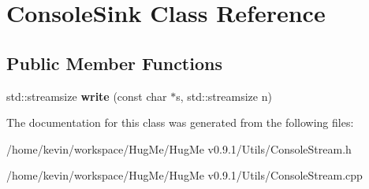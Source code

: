 \hypertarget{classConsoleSink}{
\section{ConsoleSink Class Reference}
\label{classConsoleSink}
}
\subsection*{Public Member Functions}
\begin{DoxyCompactItemize}
\item 
\hypertarget{classConsoleSink_a85f60198534d158e266a6bc38cbf2153}{
std::streamsize {\bfseries write} (const char $\ast$s, std::streamsize n)}
\label{classConsoleSink_a85f60198534d158e266a6bc38cbf2153}

\end{DoxyCompactItemize}


The documentation for this class was generated from the following files:\begin{DoxyCompactItemize}
\item 
/home/kevin/workspace/HugMe/HugMe v0.9.1/Utils/ConsoleStream.h\item 
/home/kevin/workspace/HugMe/HugMe v0.9.1/Utils/ConsoleStream.cpp\end{DoxyCompactItemize}
